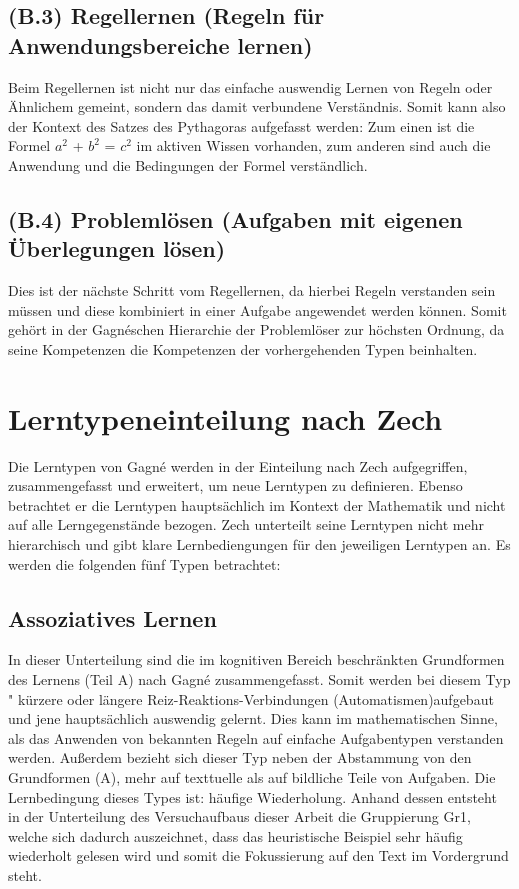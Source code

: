 \subsection[]{(B.3) Regellernen (Regeln für Anwendungsbereiche lernen)}

Beim Regellernen ist nicht nur das einfache auswendig Lernen von Regeln oder Ähnlichem gemeint, sondern das damit verbundene Verständnis. Somit kann also der Kontext des Satzes des Pythagoras aufgefasst werden: Zum einen ist die Formel $a^2$ + $b^2$ = $c^2$ im aktiven Wissen vorhanden, zum anderen sind auch die Anwendung und die Bedingungen der Formel verständlich\cite{zech1983grundkurs}.

\subsection[]{(B.4) Problemlösen (Aufgaben mit eigenen Überlegungen lösen)}

Dies ist der nächste Schritt vom Regellernen, da hierbei Regeln verstanden sein müssen und diese kombiniert in einer Aufgabe angewendet werden können. Somit gehört in der Gagnéschen Hierarchie der Problemlöser zur höchsten Ordnung, da seine Kompetenzen die Kompetenzen der vorhergehenden Typen beinhalten\cite{zech1983grundkurs}.

\section{Lerntypeneinteilung nach Zech}

Die Lerntypen von Gagné werden in der Einteilung nach Zech aufgegriffen, zusammengefasst und erweitert, um neue Lerntypen zu definieren. Ebenso betrachtet er die Lerntypen hauptsächlich im Kontext der Mathematik und nicht auf alle Lerngegenstände bezogen. Zech unterteilt seine Lerntypen nicht mehr hierarchisch und gibt klare Lernbediengungen für den jeweiligen Lerntypen an. Es werden die folgenden fünf Typen betrachtet:

\subsection[]{Assoziatives Lernen}

In dieser Unterteilung sind die im kognitiven Bereich beschränkten Grundformen des Lernens (Teil A) nach Gagné zusammengefasst. Somit werden bei diesem Typ " kürzere oder längere Reiz-Reaktions-Verbindungen (Automatismen)\grqq  aufgebaut und jene hauptsächlich auswendig gelernt. Dies kann im mathematischen Sinne, als das Anwenden von bekannten Regeln auf einfache Aufgabentypen verstanden werden. Außerdem bezieht sich dieser Typ neben der Abstammung von den Grundformen (A), mehr auf texttuelle als auf bildliche Teile von Aufgaben.
Die Lernbedingung dieses Types ist: häufige Wiederholung. 
Anhand dessen entsteht in der Unterteilung des Versuchaufbaus dieser Arbeit die Gruppierung \gls{Gr1}, welche sich dadurch auszeichnet, dass das heuristische Beispiel sehr häufig wiederholt gelesen wird und somit die Fokussierung auf den Text im Vordergrund steht\cite{zech1983grundkurs}. 


